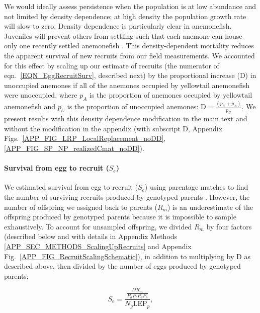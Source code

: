 \documentclass[12pt, oneside]{article}   	%
\begin{document}
We would ideally assess persistence when the population is at low abundance and not limited by density dependence; at high density the population growth rate will slow to zero. Density dependence is particularly clear in anemonefish. Juveniles will prevent others from settling such that each anemone can house only one recently settled anemonefish \citep{buston2003forcible}. This density-dependent mortality reduces the apparent survival of new recruits from our field measurements. We accounted for this effect by scaling up our estimate of recruits (the numerator of eqn.\ \ref{EQN_EggRecruitSurv}, described next) by the proportional increase ($\text{D}$) in unoccupied anemones if all of the anemones occupied by yellowtail anemonefish were unoccupied, where $p_A$ is the proportion of anemones occupied by yellowtail anemonefish and $p_U$ is the proportion of unoccupied anemones: $\text{D} = \frac{(p_U + p_A)}{p_U}$. We present results with this density dependence modification in the main text and without the modification in the appendix (with subscript D, Appendix Figs.\ \ref{APP_FIG_LRP_LocalReplacement_noDD}, \ref{APP_FIG_SP_NP_realizedCmat_noDD}). %

\paragraph*{Survival from egg to recruit ($S_e$)}

We estimated survival from egg to recruit ($S_e$) using parentage matches to find the number of surviving recruits produced by genotyped parents \citep[similar to][]{johnson2018integrating}. However, the number of offspring we assigned back to parents ($R_m$) is an underestimate of the offspring produced by genotyped parents because it is impossible to sample exhaustively. To account for unsampled offspring, we divided $R_m$ by four factors (described below and with details in Appendix Methods \ref{APP_SEC_METHODS_ScalingUpRecruits} and Appendix Fig.\ \ref{APP_FIG_RecruitScalingSchematic}), in addition to multiplying by $\text{D}$ as described above, then divided by the number of eggs produced by genotyped parents:

\begin{equation}
S_e = \frac{\frac{D R_m}{P_h P_c P_d P_s}}{N_g \text{LEP}_p}, \label{EQN_EggRecruitSurv}
\end{equation}
\end{document}

